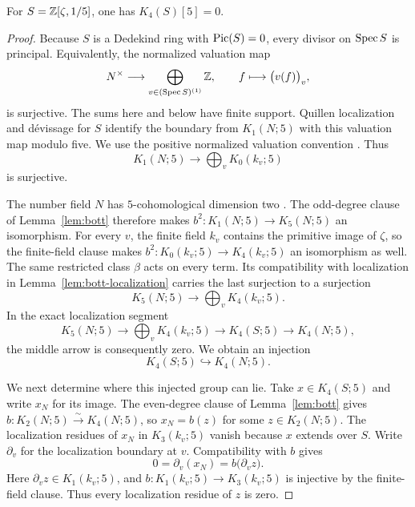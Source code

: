 \begin{lemma}
\label{lem:cyclotomic-k4}
For $S=\mathbb Z[\zeta,1/5]$, one has $K_4(S)[5]=0$.
\end{lemma}

\begin{proof}
Because $S$ is a Dedekind ring with $\operatorname{Pic}(S)=0$, every divisor
on $\operatorname{Spec} S$ is principal.  Equivalently, the normalized valuation
map
\[
 N^\times\longrightarrow\bigoplus_{v\in(\operatorname{Spec} S)^{(1)}}\mathbb Z,
 \qquad f\longmapsto\bigl(v(f)\bigr)_v,
\]
is surjective.  The sums here and below have finite support.  Quillen
localization and d\'evissage for $S$
\cite[\S7, Proposition~3.2 and paragraph~3.4]{Quillen1973Higher} identify the
boundary from $K_1(N;5)$ with this valuation map modulo five.  We use
the positive normalized valuation convention
\cite[Example~V.6.1.2 and (V.6.6)]{Weibel2013}.  Thus
\[
 K_1(N;5)\longrightarrow\bigoplus_vK_0(k_v;5)
\]
is surjective.

The number field $N$ has $5$-cohomological dimension two
\cite[VI.\S7 and VI.8.2]{Weibel2013}.  The odd-degree clause of
Lemma~\ref{lem:bott} therefore makes
$b^2:K_1(N;5)\to K_5(N;5)$ an isomorphism.  For every $v$, the finite
field $k_v$ contains the primitive image of $\zeta$, so the finite-field
clause makes $b^2:K_0(k_v;5)\to K_4(k_v;5)$ an isomorphism as well.
The same restricted class $\beta$ acts on every term.  Its compatibility
with localization in Lemma~\ref{lem:bott-localization} carries the last
surjection to a surjection
\[
 K_5(N;5)\longrightarrow\bigoplus_vK_4(k_v;5).
\]
In the exact localization segment
\[
 K_5(N;5)\longrightarrow\bigoplus_vK_4(k_v;5)
 \longrightarrow K_4(S;5)\longrightarrow K_4(N;5),
\]
the middle arrow is consequently zero.  We obtain an injection
\begin{equation}
 \label{eq:k4-restriction}
 K_4(S;5)\hookrightarrow K_4(N;5).
\end{equation}

We next determine where this injected group can lie.  Take
$x\in K_4(S;5)$ and write $x_N$ for its image.  The even-degree
clause of Lemma~\ref{lem:bott} gives
$b:K_2(N;5)\xrightarrow{\sim}K_4(N;5)$, so $x_N=b(z)$ for some
$z\in K_2(N;5)$.  The localization residues of $x_N$ in
$K_3(k_v;5)$ vanish because $x$ extends over $S$.  Write
$\partial_v$ for the localization boundary at $v$.  Compatibility with
$b$ gives
\[
 0=\partial_v(x_N)=b\bigl(\partial_v z\bigr).
\]
Here $\partial_v z\in K_1(k_v;5)$, and
$b:K_1(k_v;5)\to K_3(k_v;5)$ is injective by the finite-field clause.
Thus every localization residue of $z$ is zero.


\end{proof}
